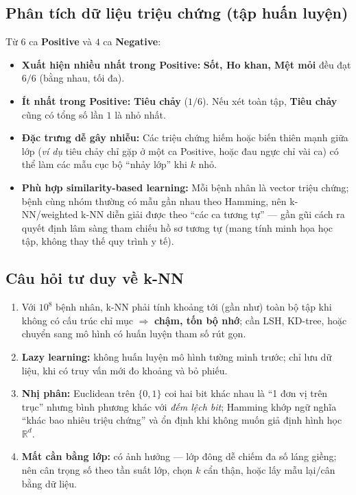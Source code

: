 \subsection*{Phân tích dữ liệu triệu chứng (tập huấn luyện)}

Từ $6$ ca \textbf{Positive} và $4$ ca \textbf{Negative}:

\begin{itemize}\setlength\itemsep{0pt}
  \item \textbf{Xuất hiện nhiều nhất trong Positive:} \textbf{Sốt, Ho khan, Mệt mỏi} đều đạt $6/6$ (bằng nhau, tối đa).
  \item \textbf{Ít nhất trong Positive:} \textbf{Tiêu chảy} ($1/6$). Nếu xét toàn tập, \textbf{Tiêu chảy} cũng có tổng số lần $1$ là nhỏ nhất.
  \item \textbf{Đặc trưng dễ gây nhiễu:} Các triệu chứng hiếm hoặc biến thiên mạnh giữa lớp (\emph{ví dụ} tiêu chảy chỉ gặp ở một ca Positive, hoặc đau ngực chỉ vài ca) có thể làm các mẫu cục bộ ``nhảy lớp'' khi $k$ nhỏ.
  \item \textbf{Phù hợp similarity-based learning:} Mỗi bệnh nhân là vector triệu chứng; bệnh cùng nhóm thường có mẫu gần nhau theo Hamming, nên k-NN/weighted k-NN diễn giải được theo ``các ca tương tự'' --- gần gũi cách ra quyết định lâm sàng tham chiếu hồ sơ tương tự (mang tính minh họa học tập, không thay thế quy trình y tế).
\end{itemize}

\subsection*{Câu hỏi tư duy về k-NN}

\begin{enumerate}\setlength\itemsep{2pt}
  \item Với $10^8$ bệnh nhân, k-NN phải tính khoảng tới (gần như) toàn bộ tập khi không có cấu trúc chỉ mục $\Rightarrow$ \textbf{chậm, tốn bộ nhớ}; cần LSH, KD-tree, hoặc chuyển sang mô hình có huấn luyện tham số rút gọn.
  \item \textbf{Lazy learning:} không huấn luyện mô hình tường minh trước; chỉ lưu dữ liệu, khi có truy vấn mới đo khoảng và bỏ phiếu.
  \item \textbf{Nhị phân:} Euclidean trên $\{0,1\}$ coi hai bit khác nhau là ``1 đơn vị trên trục'' nhưng bình phương khác với \emph{đếm lệch bit}; Hamming khớp ngữ nghĩa ``khác bao nhiêu triệu chứng'' và ổn định khi không muốn giả định hình học $\mathbb{R}^d$.
  \item \textbf{Mất cằn bằng lớp:} có ảnh hưởng --- lớp đông dễ chiếm đa số láng giềng; nên cân trọng số theo tần suất lớp, chọn $k$ cẩn thận, hoặc lấy mẫu lại/cân bằng dữ liệu.
\end{enumerate}
